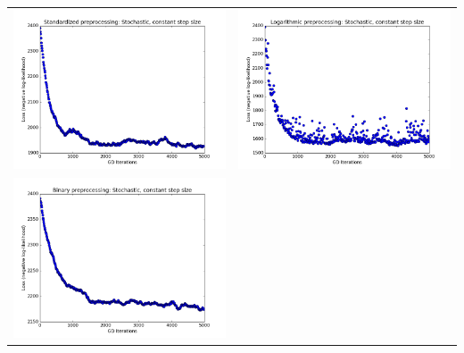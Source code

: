 \documentclass[11pt]{article}
\begin{document}
\begin{enumerate}[1.]
\begin{tabular}{cc}
\includegraphics[scale=0.4]{images/p3_2_Standardized} & \includegraphics[scale=0.4]{images/p3_2_Logarithmic} \\
\includegraphics[scale=0.4]{images/p3_2_Binary} &

\end{tabular}
\end{enumerate}
\end{document}
